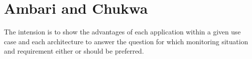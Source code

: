 \section{Ambari and Chukwa}

The intension is to show the advantages of each application within a given use case and each architecture to answer the question for which monitoring situation and requirement either \amb or \chuk should be preferred.



